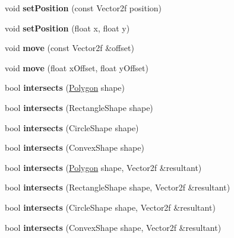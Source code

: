 \begin{DoxyCompactItemize}
void {\bfseries set\+Position} (const Vector2f position)
\item 
\mbox{\label{class_polygon_a59fc0fa86f807dc3921bae20739fdbb1}} 
void {\bfseries set\+Position} (float x, float y)
\item 
\mbox{\label{class_polygon_a21dc29d3c6dfa6d59a4f62dc0b135e50}} 
void {\bfseries move} (const Vector2f \&offset)
\item 
\mbox{\label{class_polygon_ab809ff31ab4a7ec2ebe6e5b3ef2217c5}} 
void {\bfseries move} (float x\+Offset, float y\+Offset)
\item 
\mbox{\label{class_polygon_a15574e83f243b648b0d70537b41118ae}} 
bool {\bfseries intersects} (\mbox{\hyperlink{class_polygon}{Polygon}} shape)
\item 
\mbox{\label{class_polygon_ad4a0ce3f20094604b01dd96d06257ea1}} 
bool {\bfseries intersects} (Rectangle\+Shape shape)
\item 
\mbox{\label{class_polygon_ad9ce9cb3c6871e75099a261a810bedcc}} 
bool {\bfseries intersects} (Circle\+Shape shape)
\item 
\mbox{\label{class_polygon_a24df2b2ee889cdd07ea91ccaa4810a93}} 
bool {\bfseries intersects} (Convex\+Shape shape)
\item 
\mbox{\label{class_polygon_a713983b426b75523599e862924bca782}} 
bool {\bfseries intersects} (\mbox{\hyperlink{class_polygon}{Polygon}} shape, Vector2f \&resultant)
\item 
\mbox{\label{class_polygon_aa1af5f5482999785aed533d16279c67b}} 
bool {\bfseries intersects} (Rectangle\+Shape shape, Vector2f \&resultant)
\item 
\mbox{\label{class_polygon_a874be1c28a2a1477d1ea5d85ece74822}} 
bool {\bfseries intersects} (Circle\+Shape shape, Vector2f \&resultant)
\item 
\mbox{\label{class_polygon_ab7fb23f4dbf6277688c4fb11f0a5938f}} 
bool {\bfseries intersects} (Convex\+Shape shape, Vector2f \&resultant)

\end{DoxyCompactItemize}
